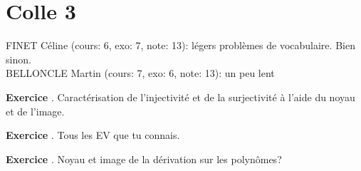 \documentclass[10pt,a4paper]{article}
\newcounter{question}
\newcounter{exo}
\newenvironment{exo}{\vspace{0.5cm}\setcounter{question}{0}\addtocounter{exo}{1} \noindent \textbf{Exercice \theexo}. \normalsize }{\par}
\begin{document}
	\section*{Colle 3}
	\setcounter{exo}{0}
	FINET Céline (cours: 6, exo: 7, note: 13): légers problèmes de vocabulaire. Bien sinon.\\
	BELLONCLE Martin (cours: 7, exo: 6, note: 13): un peu lent\\
	
	\begin{exo}
		 Caractérisation de l'injectivité et de la surjectivité à l'aide du noyau et de l'image.
	\end{exo}		
	
	\begin{exo}
		Tous les EV que tu connais.
	\end{exo}
	
	\begin{exo}
		Noyau et image de la dérivation sur les polynômes?
	\end{exo}	
\end{document}
